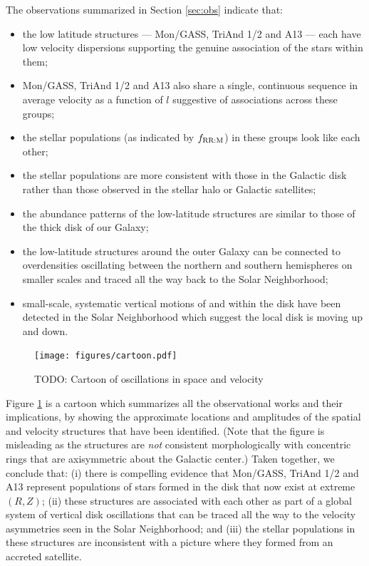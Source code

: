 \documentclass[galaxies,article,submit,moreauthors,pdftex,10pt,a4paper]{mdpi}
\begin{document}
The observations summarized in Section \ref{sec:obs} indicate that:
\begin{itemize}
\item the low latitude structures --- Mon/GASS, TriAnd 1/2 and A13  --- each have low velocity dispersions supporting the genuine association of the stars within them;
\item Mon/GASS, TriAnd 1/2 and A13 also share a single, continuous sequence in average velocity as a function of $l$ suggestive of associations across these groups;
\item the stellar populations (as indicated by $f_{\rm RR:M}$) in these groups look like each other;
\item the stellar populations are more consistent with those in the Galactic disk rather than those observed in the stellar halo or Galactic  satellites;
\item the abundance patterns  of the low-latitude structures are similar to those of the thick disk of our Galaxy;
\item the low-latitude structures around the outer Galaxy can be connected to overdensities oscillating between the northern and southern hemispheres on smaller scales and traced all the way back to the Solar Neighborhood;
\item small-scale, systematic vertical motions of and within the disk have been detected in the Solar Neighborhood which suggest the local disk is moving up and down.
\end{itemize}

\begin{figure}[t]
\centering
\texttt{[image: figures/cartoon.pdf]}
\caption{\label{fig:cartoon}
TODO: Cartoon of oscillations in space and velocity}
\end{figure}

Figure \ref{fig:cartoon} is a cartoon which summarizes all the observational works and their implications, by showing the approximate locations and amplitudes of the spatial and velocity structures that have been identified. (Note that the figure is misleading as the structures are {\it not} consistent morphologically with concentric rings that are axisymmetric about the Galactic center.)
Taken together, we conclude that: (i) there is compelling evidence that Mon/GASS, TriAnd 1/2 and A13 represent populations of stars formed in the disk that now exist at extreme $(R,Z)$;
(ii) these structures are associated with each other as part of a global system of vertical disk oscillations that can be traced all the way to the velocity asymmetries seen in the Solar Neighborhood; and
(iii) the stellar populations in these structures are inconsistent with a picture where they formed from an accreted satellite.
\end{document}
